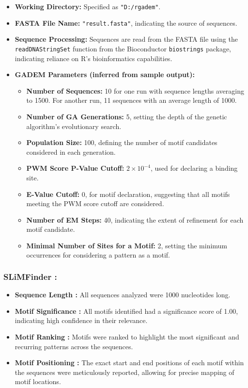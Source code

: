 \begin{itemize}
    \item \textbf{Working Directory:} Specified as \texttt{"D:/rgadem"}.
    \item \textbf{FASTA File Name:} \texttt{"result.fasta"}, indicating the source of sequences.
    \item \textbf{Sequence Processing:} Sequences are read from the FASTA file using the \texttt{readDNAStringSet} function from the Bioconductor \texttt{biostrings} package, indicating reliance on R's bioinformatics capabilities.
    \item \textbf{GADEM Parameters (inferred from sample output):}
    \begin{itemize}
        \item \textbf{Number of Sequences:} 10 for one run with sequence lengths averaging to 1500. For another run, 11 sequences with an average length of 1000.
        \item \textbf{Number of GA Generations:} 5, setting the depth of the genetic algorithm's evolutionary search.
        \item \textbf{Population Size:} 100, defining the number of motif candidates considered in each generation.
        \item \textbf{PWM Score P-Value Cutoff:} $2 \times 10^{-4}$, used for declaring a binding site.
        \item \textbf{E-Value Cutoff:} 0, for motif declaration, suggesting that all motifs meeting the PWM score cutoff are considered.
        \item \textbf{Number of EM Steps:} 40, indicating the extent of refinement for each motif candidate.
        \item \textbf{Minimal Number of Sites for a Motif:} 2, setting the minimum occurrences for considering a pattern as a motif.
    \end{itemize}
\end{itemize}
\subsubsection{SLiMFinder :}
\begin{itemize}
    \item \textbf{Sequence Length : } All sequences analyzed were 1000 nucleotides long.
    \item \textbf{Motif Significance : }All motifs identified had a significance score of 1.00, indicating high confidence in their relevance.
    \item \textbf{Motif Ranking : }Motifs were ranked to highlight the most significant and recurring patterns across the sequences.
    \item \textbf{Motif Positioning : }The exact start and end positions of each motif within the sequences were meticulously reported, allowing for precise mapping of motif locations.
       
  
\end{itemize}





